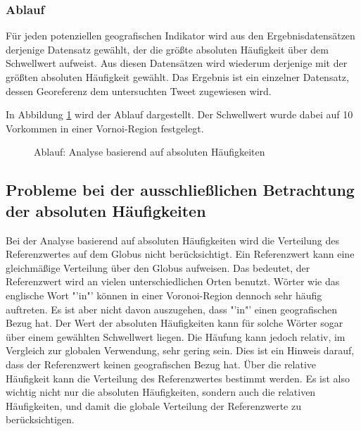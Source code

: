			\subsubsection{Ablauf}

				Für jeden potenziellen geografischen Indikator wird aus den Ergebnisdatensätzen derjenige Datensatz gewählt, der die größte absoluten Häufigkeit über dem Schwellwert aufweist.
				Aus diesen Datensätzen wird wiederum derjenige mit der größten absoluten Häufigkeit gewählt. 
				Das Ergebnis ist ein einzelner Datensatz, dessen Georeferenz dem untersuchten Tweet zugewiesen wird.

				In Abbildung \ref{img:absHaufBsp} wird der Ablauf dargestellt.
				Der Schwellwert wurde dabei auf 10 Vorkommen in einer Vornoi-Region festgelegt. 
				
				\begin{figure}[!ht]
	
						\centering
						\caption{Ablauf: Analyse basierend auf absoluten Häufigkeiten}
						\label{img:absHaufBsp}
					
				\end{figure}

		\subsection{Probleme bei der ausschließlichen Betrachtung der absoluten Häufigkeiten} 

			Bei der Analyse basierend auf absoluten Häufigkeiten wird die Verteilung des Referenzwertes auf dem Globus nicht berücksichtigt.
			Ein Referenzwert kann eine gleichmäßige Verteilung über den Globus aufweisen.
			Das bedeutet, der Referenzwert wird an vielen unterschiedlichen Orten benutzt. 
			Wörter wie das englische Wort "'in"' können in einer Voronoi-Region dennoch sehr häufig auftreten. 
			Es ist aber nicht davon auszugehen, dass "'in"' einen geografischen Bezug hat.  
			Der Wert der absoluten Häufigkeiten kann für solche Wörter sogar über einem gewählten Schwellwert liegen.
			Die Häufung kann jedoch relativ, im Vergleich zur globalen Verwendung, sehr gering sein.
			Dies ist ein Hinweis darauf, dass der Referenzwert keinen geografischen Bezug hat.
			Über die relative Häufigkeit kann die Verteilung des Referenzwertes bestimmt werden. 
			Es ist also wichtig nicht nur die absoluten Häufigkeiten, sondern auch die relativen Häufigkeiten, und damit die globale Verteilung der Referenzwerte zu berücksichtigen.

